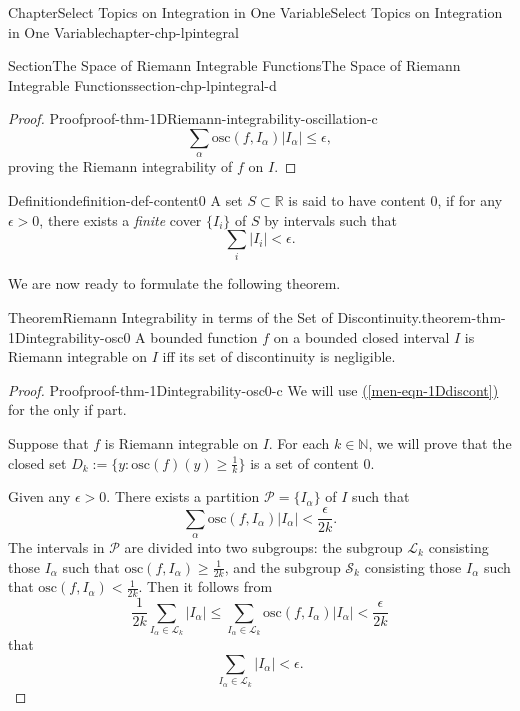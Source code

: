 \documentclass[oneside,10pt,]{book}
\newcommand{\xreffont}{\relax}
\numberwithin{equation}{section}
\newcommand{\bbR}{\mathbb{R}}
\newcommand{\bbN}{\mathbb{N}}
\newcommand{\cL}{\mathcal{L}}
\newcommand{\cP}{\mathcal{P}}
\newcommand{\cS}{\mathcal{S}}
\newcommand{\osc}{\text{osc}}
\begin{document}
\begin{chapterptx}{Chapter}{Select Topics on Integration in One Variable}{}{Select Topics on Integration in One Variable}{}{}{chapter-chp-lpintegral}
\begin{sectionptx}{Section}{The Space of Riemann Integrable Functions}{}{The Space of Riemann Integrable Functions}{}{}{section-chp-lpintegral-d}
\begin{proof}{Proof}{}{proof-thm-1DRiemann-integrability-oscillation-c}
\begin{equation*}
\sum_{\alpha} \osc(f,I_{\alpha})\vert I_{\alpha} \vert \le \epsilon,
\end{equation*}
proving the Riemann integrability of \(f\) on \(I\).%
\end{proof}
\begin{definition}{Definition}{}{definition-def-content0}%
%
A set \(S\subset \bbR\) is said to have content \(0\), if for any \(\epsilon >0\), there exists a \emph{finite} cover \(\{I_{i}\} \) of \(S\) by intervals such that%
\begin{equation*}
\sum_{i}\vert I_{i}\vert < \epsilon.
\end{equation*}
%
\end{definition}
We are now ready to formulate the following theorem.%
\begin{theorem}{Theorem}{Riemann Integrability in terms of the Set of Discontinuity.}{}{theorem-thm-1Dintegrability-osc0}%
A bounded function \(f\) on a bounded closed interval \(I\) is Riemann integrable on \(I\) iff its set of discontinuity is negligible.%
\end{theorem}
\begin{proof}{Proof}{}{proof-thm-1Dintegrability-osc0-c}
We will use \hyperref[men-eqn-1Ddiscont]{({\xreffont\ref{men-eqn-1Ddiscont}})} for the only if part.%
\par
Suppose that \(f\) is Riemann integrable on \(I\). For each \(k\in \bbN\), we will prove that the closed set \(D_{k}:=\{y: \osc(f)(y)\ge \frac 1k\}\) is a set of content \(0\).%
\par
Given any \(\epsilon >0\). There exists a partition \(\cP=\{I_{\alpha}\}\) of \(I\) such that%
\begin{equation*}
\sum_{\alpha} \osc(f, I_{\alpha})\vert I_{\alpha} \vert < \frac{\epsilon}{2k}.
\end{equation*}
The intervals in \(\cP\) are divided into two subgroups: the subgroup \(\cL_{k}\) consisting those \(I_{\alpha}\) such that \(\osc(f, I_{\alpha})\ge \frac{1}{2k}\), and the subgroup \(\cS_{k}\) consisting those \(I_{\alpha}\) such that \(\osc(f, I_{\alpha})< \frac{1}{2k}\). Then it follows from%
\begin{equation*}
\frac{1}{2k} \sum_{I_{\alpha}\in \cL_{k} } \vert I_{\alpha} \vert \le
\sum_{I_{\alpha}\in \cL_{k} } \osc(f, I_{\alpha})\vert I_{\alpha} \vert < \frac{\epsilon}{2k}
\end{equation*}
that%
\begin{equation*}
\sum_{I_{\alpha}\in \cL_{k} } \vert I_{\alpha} \vert < \epsilon.

\end{equation*}
\end{proof}
\end{sectionptx}
\end{chapterptx}
\end{document}
